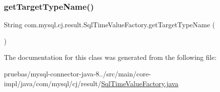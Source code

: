 \mbox{\label{classcom_1_1mysql_1_1cj_1_1result_1_1_sql_time_value_factory_aff24d902b1037965e047b844ded455ca}} 
\subsubsection{\texorpdfstring{get\+Target\+Type\+Name()}{getTargetTypeName()}}
{\footnotesize\ttfamily String com.\+mysql.\+cj.\+result.\+Sql\+Time\+Value\+Factory.\+get\+Target\+Type\+Name (\begin{DoxyParamCaption}{ }\end{DoxyParamCaption})}



The documentation for this class was generated from the following file\+:\begin{DoxyCompactItemize}
\item 
pruebas/mysql-\/connector-\/java-\/8../src/main/core-\/impl/java/com/mysql/cj/result/\mbox{\hyperlink{_sql_time_value_factory_8java}{Sql\+Time\+Value\+Factory.\+java}}\end{DoxyCompactItemize}
